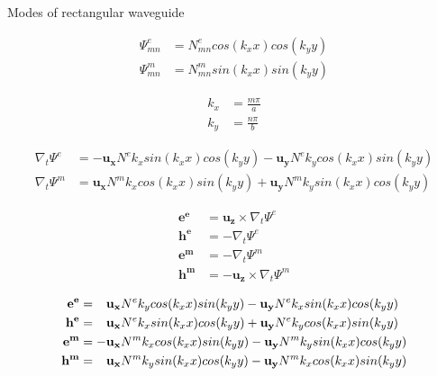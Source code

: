 \documentclass{article}
\newcommand\myvec[1]{\mathbf{#1}}
\begin{document}
Modes of rectangular waveguide

\begin{align}
   \Psi_{mn}^e &= N_{mn}^e cos(k_xx)cos(k_yy) \\
   \Psi_{mn}^m &= N_{mn}^m sin(k_xx)sin(k_yy)
\end{align}

\begin{align}
   k_x &= \frac{m\pi}{a} \\
   k_y &= \frac{n\pi}{b}
\end{align}

\begin{align}
  \nabla_t\Psi^e &= -\myvec{u_x}N^ek_x sin(k_xx)cos(k_yy) 
                    - \myvec{u_y}N^ek_y cos(k_xx)sin(k_yy) \\
  \nabla_t\Psi^m &= \myvec{u_x}N^mk_x cos(k_xx)sin(k_yy) 
                    + \myvec{u_y}N^mk_y sin(k_xx)cos(k_yy)
\end{align}

\begin{align}
  \myvec{e^e} &= \myvec{u_z} \times \nabla_t\Psi^e \\
  \myvec{h^e} &= -\nabla_t\Psi^e  \\
  \myvec{e^m} &= - \nabla_t\Psi^m \\
  \myvec{h^m} &= - \myvec{u_z} \times \nabla_t\Psi^m
\end{align}


\begin{align}
  \myvec{e^e} &= \hphantom{-}\myvec{u_x}N^ek_y cos(k_xx)sin(k_yy)
                     -\myvec{u_y}N^ek_x sin(k_xx)cos(k_yy) \\
  \myvec{h^e} &= \hphantom{-}\myvec{u_x}N^ek_x sin(k_xx)cos(k_yy) 
                  +\myvec{u_y}N^ek_y cos(k_xx)sin(k_yy)\\
  \myvec{e^m} &=   -\myvec{u_x}N^mk_x cos(k_xx)sin(k_yy) 
                    -\myvec{u_y}N^mk_y sin(k_xx)cos(k_yy) \\
  \myvec{h^m} &=  \hphantom{-}\myvec{u_x}N^mk_y sin(k_xx)cos(k_yy) 
                    - \myvec{u_y}N^mk_x cos(k_xx)sin(k_yy)
\end{align}
\end{document}
